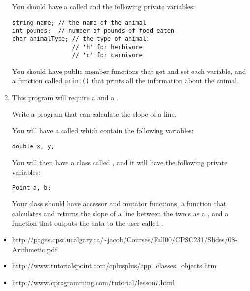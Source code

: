 \begin{enumerate}
You should have a  called  and the following private variables:

\noindent\begin{minipage}{\linewidth}\begin{lstlisting}
string name; // the name of the animal
int pounds;  // number of pounds of food eaten
char animalType; // the type of animal: 
                 // 'h' for herbivore
                 // 'c' for carnivore
\end{lstlisting}\end{minipage}

You should have public member functions that get and set each variable, and a function called \texttt{print()} that prints all the information about the animal.

\item This program will require a  and a .

Write a program that can calculate the slope of a line.

You will have a  called  which contain the following variables:

\noindent\begin{minipage}{\linewidth}\begin{lstlisting}
double x, y;
\end{lstlisting}\end{minipage}

You will then have a class called , and it will have the following private variables:

\noindent\begin{minipage}{\linewidth}\begin{lstlisting}
Point a, b;
\end{lstlisting}\end{minipage}

Your class should have accessor and mutator functions, a function that calculates and returns the slope of a line between the two s as a , and a function that outputs the data to the user called .
\end{enumerate}





\begin{itemize}
\item \url{http://pages.cpsc.ucalgary.ca/~jacob/Courses/Fall00/CPSC231/Slides/08-Arithmetic.pdf}
\item \url{http://www.tutorialspoint.com/cplusplus/cpp_classes_objects.htm}
\item \url{http://www.cprogramming.com/tutorial/lesson7.html}
\end{itemize}	
